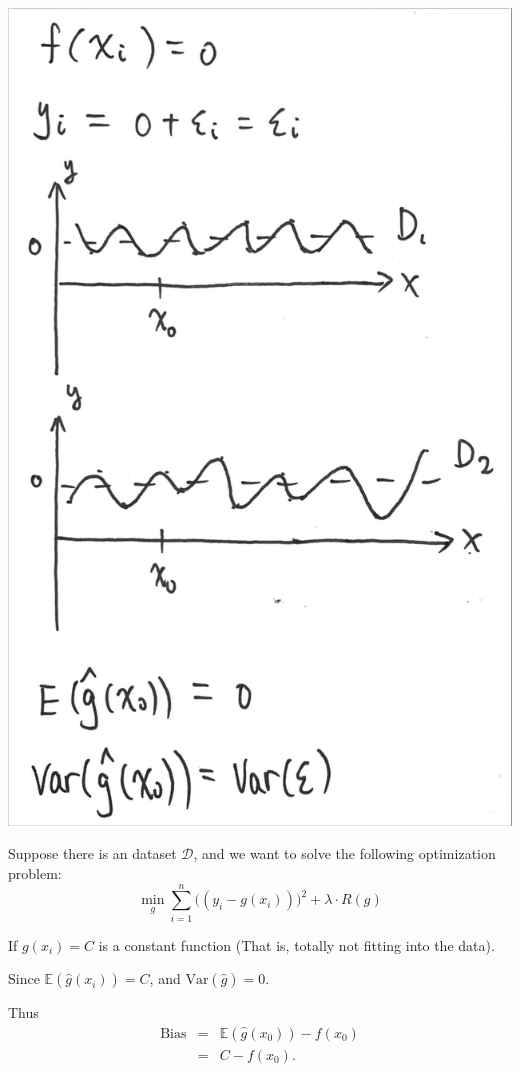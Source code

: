 \documentclass{article}
\theoremstyle{MyNonumberplain}
\theoremstyle{break}
\newcommand{\ev}{\mathbb{E}}
\newcommand{\var}{\text{Var}}
\newcommand{\bias}{\text{Bias}}
\theoremstyle{break}
\theoremstyle{break}
\theoremstyle{break}
\begin{document}
\begin{center}
    \includegraphics*[scale=0.1]{Images/img5.jpg}
\end{center}

Suppose there is an dataset $\mathcal{D}$, and we want to solve the following optimization problem: $$\min_g\sum_{i=1}^{n}\bigl((y_i-g(x_i))\bigr)^2+\lambda\cdot R(g)$$

If $g(x_i)=C$ is a constant function (That is, totally not fitting into the data).

Since $\ev(\hat{g}(x_i))=C$, and $\var(\hat{g})=0$.

Thus 
\begin{eqnarray*}
    \bias &=&\ev(\hat{g}(x_0))-f(x_0)\\
          &=& C-f(x_0).
\end{eqnarray*}
\end{document}

